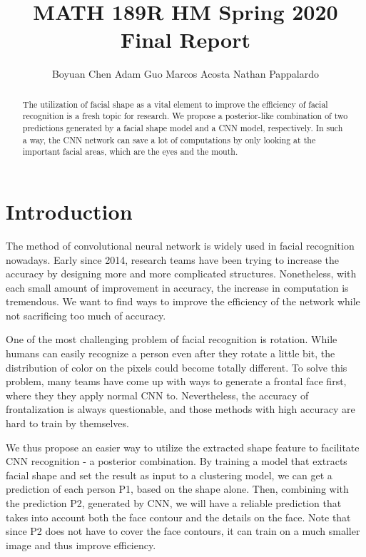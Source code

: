 \documentclass{article}
\title{MATH 189R HM Spring 2020 Final Report}
\author{%
  Boyuan Chen \And
  Adam Guo \And
  Marcos Acosta \And
  Nathan Pappalardo
}
\begin{document}

\maketitle

\begin{abstract}
  The utilization of facial shape as a vital element to improve the efficiency
  of facial recognition is a fresh topic for research. We propose a
  posterior-like combination of two predictions generated by a facial shape
  model and a CNN model, respectively. In such a way, the CNN network can save a
  lot of computations by only looking at the important facial areas, which are
  the eyes and the mouth.
\end{abstract}


\section{Introduction}

The method of convolutional neural network is widely used in facial recognition
nowadays. Early since 2014, research teams have been trying to increase the
accuracy by designing more and more complicated structures. Nonetheless, with
each small amount of improvement in accuracy, the increase in computation is
tremendous. We want to find ways to improve the efficiency of the network while
not sacrificing too much of accuracy. 

One of the most challenging problem of facial recognition is rotation. While
humans can easily recognize a person even after they rotate a little bit, the
distribution of color on the pixels could become totally different. To solve
this problem, many teams have come up with ways to generate a frontal face
first, where they they apply normal CNN to. Nevertheless, the accuracy of
frontalization is always questionable, and those methods with high accuracy are
hard to train by themselves. 

We thus propose an easier way to utilize the extracted shape feature to
facilitate CNN recognition - a posterior combination. By training a model that
extracts facial shape and set the result as input to a clustering model, we can
get a prediction of each person P1, based on the shape alone. Then, combining
with the prediction P2, generated by CNN, we will have a reliable prediction
that takes into account both the face contour and the details on the face. Note
that since P2 does not have to cover the face contours, it can train on a much
smaller image and thus improve efficiency.
\end{document}

